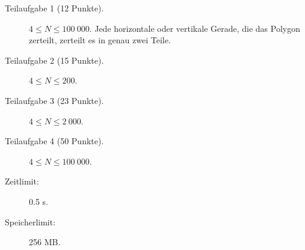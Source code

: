 \documentclass{boi2014-de}
\begin{document}
    \begin{description}
        \item[Teilaufgabe 1 (12 Punkte).] $4 \le N \le 100\ 000$.
        Jede horizontale oder vertikale Gerade, die das Polygon zerteilt, zerteilt es in genau zwei Teile.        
        \item[Teilaufgabe 2 (15 Punkte).] $4 \le N \le 200$.
        \item[Teilaufgabe 3 (23 Punkte).] $4 \le N \le 2\ 000$.
        \item[Teilaufgabe 4 (50 Punkte).] $4 \le N \le 100\ 000$.
    \end{description}

    \Constraints

    \begin{description}
        \item[Zeitlimit:] 0.5 s.
        \item[Speicherlimit:] 256 MB.
    \end{description}
\end{document}

